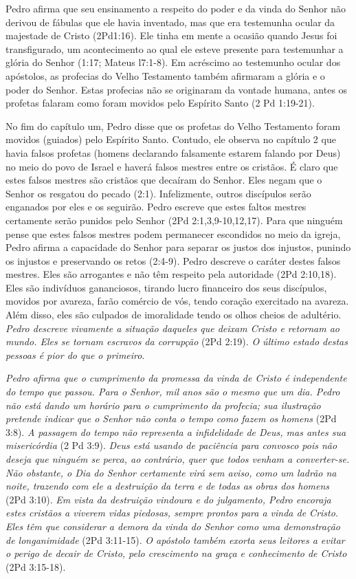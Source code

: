 \documentclass[
]{book}
\begin{document}
Pedro afirma que seu ensinamento a respeito do poder e da vinda do Senhor não derivou de fábulas que ele havia inventado, mas que era testemunha ocular da majestade de Cristo (2Pd1:16). Ele tinha em mente a ocasião quando Jesus foi transfigurado, um acontecimento ao qual ele esteve presente para testemunhar a glória do Senhor (1:17; Mateus l7:1-8). Em acréscimo ao testemunho ocular dos apóstolos, as profecias do Velho Testamento também afirmaram a glória e o poder do Senhor. Estas profecias não se originaram da vontade humana, antes os profetas falaram como foram movidos pelo Espírito Santo (2 Pd 1:19-21).

No fim do capítulo um, Pedro disse que os profetas do Velho Testamento foram movidos (guiados) pelo Espírito Santo. Contudo, ele observa no capítulo 2 que havia falsos profetas (homens declarando falsamente estarem falando por Deus) no meio do povo de Israel e haverá falsos mestres entre os cristãos. É claro que estes falsos mestres são cristãos que decaíram do Senhor. Eles negam que o Senhor os resgatou do pecado (2:1). Infelizmente, outros discípulos serão enganados por eles e os seguirão. Pedro escreve que estes faltos mestres certamente serão punidos pelo Senhor (2Pd 2:1,3,9-10,12,17). Para que ninguém pense que estes falsos mestres podem permanecer escondidos no meio da igreja, Pedro afirma a capacidade do Senhor para separar os justos dos injustos, punindo os injustos e preservando os retos (2:4-9). Pedro descreve o caráter destes falsos mestres. Eles são arrogantes e não têm respeito pela autoridade (2Pd 2:10,18). Eles são indivíduos gananciosos, tirando lucro financeiro dos seus discípulos, movidos por avareza, farão comércio de vós, tendo coração exercitado na avareza. Além disso, eles são culpados de imoralidade tendo os olhos cheios de adultério. \emph{Pedro descreve vivamente a situação daqueles que deixam Cristo e retornam ao mundo. Eles se tornam escravos da corrupção} (2Pd 2:19). \emph{O último estado destas pessoas é pior do que o primeiro}.

\emph{Pedro afirma que o cumprimento da promessa da vinda de Cristo é independente do tempo que passou. Para o Senhor, mil anos são o mesmo que um dia. Pedro não está dando um horário para o cumprimento da profecia; sua ilustração pretende indicar que o Senhor não conta o tempo como fazem os homens} (2Pd 3:8). \emph{A passagem do tempo não representa a infidelidade de Deus, mas antes sua misericórdia} (2 Pd 3:9). \emph{Deus está usando de paciência para convosco pois não deseja que ninguém se perca, ao contrário, quer que todos venham a converter-se. Não obstante, o Dia do Senhor certamente virá sem aviso, como um ladrão na noite, trazendo com ele a destruição da terra e de todas as obras dos homens} (2Pd 3:10). \emph{Em vista da destruição vindoura e do julgamento, Pedro encoraja estes cristãos a viverem vidas piedosas, sempre prontos para a vinda de Cristo. Eles têm que considerar a demora da vinda do Senhor como uma demonstração de longanimidade} (2Pd 3:11-15). \emph{O apóstolo também exorta seus leitores a evitar o perigo de decair de Cristo, pelo crescimento na graça e conhecimento de Cristo} (2Pd 3:15-18).
\end{document}
